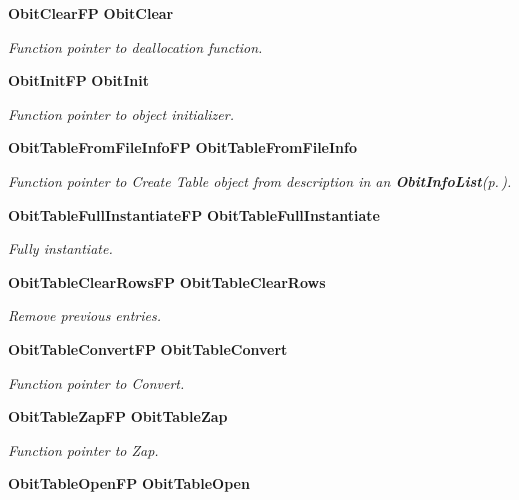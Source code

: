 \begin{CompactItemize}
{\bf Obit\-Clear\-FP} {\bf Obit\-Clear}
\begin{CompactList}\small\item\em Function pointer to deallocation function. \item\end{CompactList}\item 
{\bf Obit\-Init\-FP} {\bf Obit\-Init}
\begin{CompactList}\small\item\em Function pointer to object initializer. \item\end{CompactList}\item 
{\bf Obit\-Table\-From\-File\-Info\-FP} {\bf Obit\-Table\-From\-File\-Info}
\begin{CompactList}\small\item\em Function pointer to Create Table object from description in an {\bf Obit\-Info\-List}{\rm (p.\,\pageref{structObitInfoList})}. \item\end{CompactList}\item 
{\bf Obit\-Table\-Full\-Instantiate\-FP} {\bf Obit\-Table\-Full\-Instantiate}
\begin{CompactList}\small\item\em Fully instantiate. \item\end{CompactList}\item 
{\bf Obit\-Table\-Clear\-Rows\-FP} {\bf Obit\-Table\-Clear\-Rows}
\begin{CompactList}\small\item\em Remove previous entries. \item\end{CompactList}\item 
{\bf Obit\-Table\-Convert\-FP} {\bf Obit\-Table\-Convert}
\begin{CompactList}\small\item\em Function pointer to Convert. \item\end{CompactList}\item 
{\bf Obit\-Table\-Zap\-FP} {\bf Obit\-Table\-Zap}
\begin{CompactList}\small\item\em Function pointer to Zap. \item\end{CompactList}\item 
{\bf Obit\-Table\-Open\-FP} {\bf Obit\-Table\-Open}

\end{CompactItemize}
